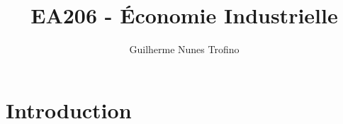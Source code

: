 \documentclass{article}
\title{EA206 - Économie Industrielle}
\author{Guilherme Nunes Trofino}
\begin{document}
\maketitle

\newpage\tableofcontents

\section{Introduction}
\end{document}
